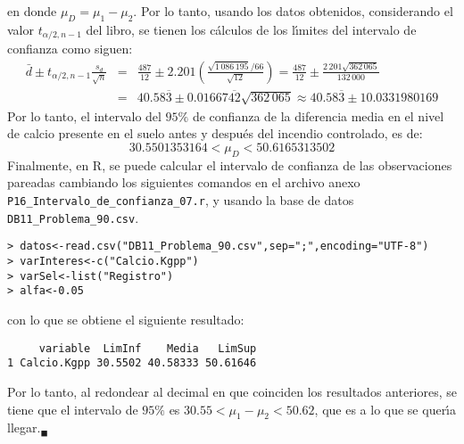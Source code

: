 \begin{solucion}
\begin{equation*}
 \end{equation*}
 en donde $\mu_D = \mu_1 - \mu_2$. Por lo tanto, usando los datos obtenidos, considerando el valor $t_{\alpha/2,n-1}$ del libro, se tienen los c\'alculos de los l\'{\i}mites del intervalo de confianza como siguen:
 \begin{eqnarray*}
  \bar{d} \pm t_{\alpha/2,n-1}\frac{s_d}{\sqrt{n}} & = & \frac{487}{12} \pm 2.201 \left( \frac{\sqrt{1\,086\,195}/66}{\sqrt{12}} \right) = \frac{487}{12} \pm  \frac{2\,201\sqrt{362\,065}}{132\,000} \\
  & = & 40.58\overline{3} \pm 0.01667\overline{42}\sqrt{362\,065} \approx 40.58\overline{3} \pm 10.0331980169
 \end{eqnarray*}
 Por lo tanto, el intervalo del $95\%$ de confianza de la diferencia media en el nivel de calcio presente en el suelo antes y despu\'es del incendio controlado, es de:
 \begin{equation*}
  30.5501353164 < \mu_D < 50.6165313502
 \end{equation*}
 Finalmente, en R, se puede calcular el intervalo de confianza de las observaciones pareadas cambiando los siguientes comandos en el archivo anexo \texttt{P16\_Intervalo\_de\_confianza\_07.r}, y usando la base de datos \texttt{DB11\_Problema\_90.csv}.
 \begin{verbatim}
> datos<-read.csv("DB11_Problema_90.csv",sep=";",encoding="UTF-8")
> varInteres<-c("Calcio.Kgpp")
> varSel<-list("Registro")
> alfa<-0.05
 \end{verbatim}
 \vspace{-0.5cm}
 con lo que se obtiene el siguiente resultado:
 \begin{verbatim}
     variable  LimInf    Media   LimSup
1 Calcio.Kgpp 30.5502 40.58333 50.61646
 \end{verbatim}
 \vspace{-0.5cm}
 Por lo tanto, al redondear al decimal en que coinciden los resultados anteriores, se tiene que el intervalo de $95\%$ es $30.55 < \mu_1 - \mu_2 < 50.62$, que es a lo que se quer\'{\i}a llegar.${}_{\blacksquare}$
\end{solucion}

